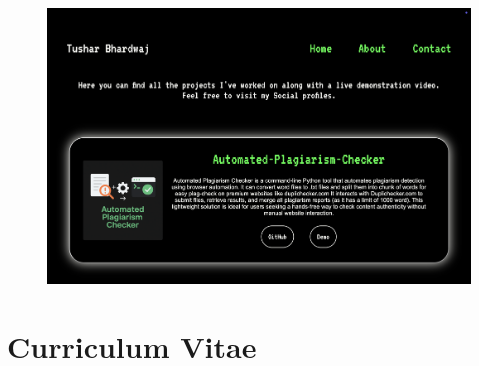 \documentclass{report}
\begin{document}
\begin{figure}[h]
\begin{minipage}{0.49\textwidth}
    \end{minipage}
    \begin{minipage}{0.49\textwidth}
        \centering
        \includegraphics[width=1\linewidth]{webshots/projects.png}
    \end{minipage}
\end{figure}

\newpage
\section{Curriculum Vitae} \par
\end{document}
